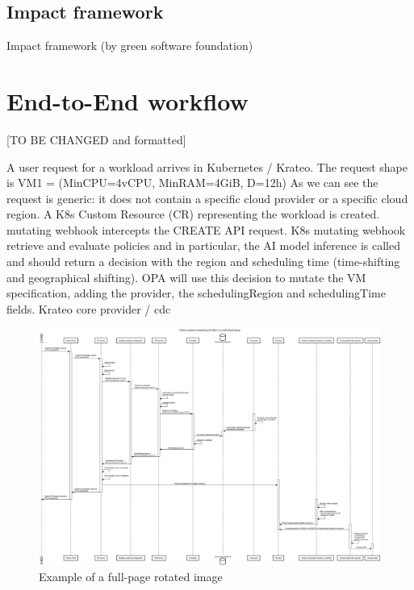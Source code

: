 \subsection{Impact framework}

Impact framework (by green software foundation)

\newpage

\section{End-to-End workflow}
\label{sec:e2eflow}

[TO BE CHANGED and formatted]



A user request for a workload arrives in Kubernetes / Krateo. 
The request shape is VM1 = (MinCPU=4vCPU, MinRAM=4GiB, D=12h)
As we can see the request is generic: it does not contain a specific cloud provider or a specific cloud region.
A K8s Custom Resource (CR) representing the workload is created.
mutating webhook intercepts the CREATE API request.
K8s mutating webhook retrieve and evaluate policies and in particular, the AI model inference is called and should return a decision with the region and scheduling time (time-shifting and geographical shifting).
OPA will use this decision to mutate the VM specification, adding the provider, the schedulingRegion and schedulingTime fields.
Krateo core provider / cdc


\begin{figure}
  \centering
  \includegraphics[width=\textheight]{images/sequence_diagram.png}
  \caption{Example of a full-page rotated image}
  \label{fig:rotated_image}
\end{figure}


\newpage
